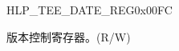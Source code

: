 \begin{register}{H}{LP\_TEE\_DATE\_REG}{0x00FC}\label{regdesc:LPTEEDATEREG}
%
%
\regnewline%
\begin{regdesc}\begin{reglist}
\label{fielddesc:LPTEEDATE}\item [LP\_TEE\_DATE] 版本控制寄存器。(R/W)
\end{reglist}\end{regdesc}
\end{register}



